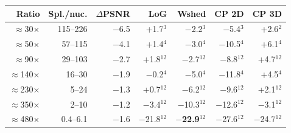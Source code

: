 \begin{tabular}{rrrrrrr}
\toprule
Ratio & Spl./nuc. & $\Delta$PSNR & LoG & Wshed & CP 2D & CP 3D \\
\midrule
$\approx$30$\times$ & 115--226 & $-$6.5 & +1.7$^{3}$ & $-$2.2$^{3}$ & $-$5.4$^{3}$ & +2.6$^{2}$ \\
$\approx$50$\times$ & 57--115 & $-$4.1 & +1.4$^{4}$ & $-$3.0$^{4}$ & $-$10.5$^{4}$ & +6.1$^{4}$ \\
$\approx$90$\times$ & 29--103 & $-$2.7 & +1.8$^{12}$ & $-$2.7$^{12}$ & $-$8.8$^{12}$ & +4.7$^{12}$ \\
$\approx$140$\times$ & 16--30 & $-$1.9 & $-$0.2$^{4}$ & $-$5.0$^{4}$ & $-$11.8$^{4}$ & +4.5$^{4}$ \\
$\approx$230$\times$ & 5--24 & $-$1.3 & +0.7$^{12}$ & $-$6.2$^{12}$ & $-$9.6$^{12}$ & +2.1$^{12}$ \\
$\approx$350$\times$ & 2--10 & $-$1.2 & $-$3.4$^{12}$ & $-$10.3$^{12}$ & $-$12.6$^{12}$ & $-$3.1$^{12}$ \\
$\approx$480$\times$ & 0.4--6.1 & $-$1.6 & $-$21.8$^{12}$ & \textbf{$-$22.9}$^{12}$ & $-$27.6$^{12}$ & $-$24.7$^{12}$ \\
\bottomrule
\end{tabular}
